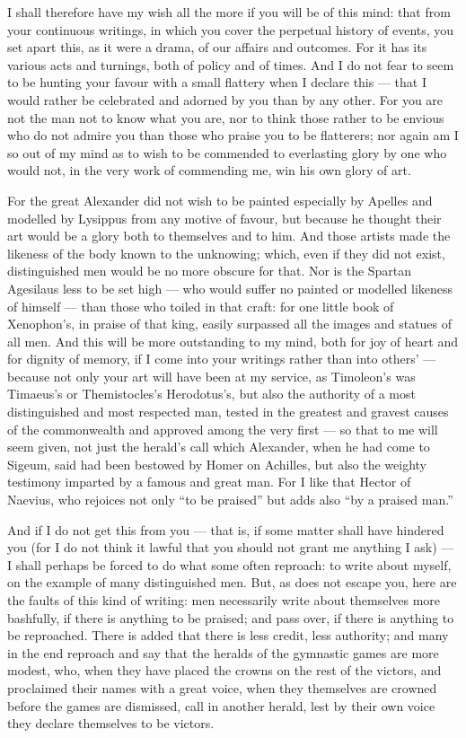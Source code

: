  I shall therefore have my wish all the more if you will be of this mind: that from your continuous writings, in which you cover the perpetual history of events, you set apart this, as it were a drama, of our affairs and outcomes. For it has its various acts and turnings, both of policy and of times. And I do not fear to seem to be hunting your favour with a small flattery when I declare this --- that I would rather be celebrated and adorned by you than by any other. For you are not the man not to know what you are, nor to think those rather to be envious who do not admire you than those who praise you to be flatterers; nor again am I so out of my mind as to wish to be commended to everlasting glory by one who would not, in the very work of commending me, win his own glory of art.

 For the great Alexander did not wish to be painted especially by Apelles and modelled by Lysippus from any motive of favour, but because he thought their art would be a glory both to themselves and to him. And those artists made the likeness of the body known to the unknowing; which, even if they did not exist, distinguished men would be no more obscure for that. Nor is the Spartan Agesilaus less to be set high --- who would suffer no painted or modelled likeness of himself --- than those who toiled in that craft: for one little book of Xenophon's, in praise of that king, easily surpassed all the images and statues of all men. And this will be more outstanding to my mind, both for joy of heart and for dignity of memory, if I come into your writings rather than into others' --- because not only your art will have been at my service, as Timoleon's was Timaeus's or Themistocles's Herodotus's, but also the authority of a most distinguished and most respected man, tested in the greatest and gravest causes of the commonwealth and approved among the very first --- so that to me will seem given, not just the herald's call which Alexander, when he had come to Sigeum, said had been bestowed by Homer on Achilles, but also the weighty testimony imparted by a famous and great man. For I like that Hector of Naevius, who rejoices not only ``to be praised'' but adds also ``by a praised man.''

 And if I do not get this from you --- that is, if some matter shall have hindered you (for I do not think it lawful that you should not grant me anything I ask) --- I shall perhaps be forced to do what some often reproach: to write about myself, on the example of many distinguished men. But, as does not escape you, here are the faults of this kind of writing: men necessarily write about themselves more bashfully, if there is anything to be praised; and pass over, if there is anything to be reproached. There is added that there is less credit, less authority; and many in the end reproach and say that the heralds of the gymnastic games are more modest, who, when they have placed the crowns on the rest of the victors, and proclaimed their names with a great voice, when they themselves are crowned before the games are dismissed, call in another herald, lest by their own voice they declare themselves to be victors.

